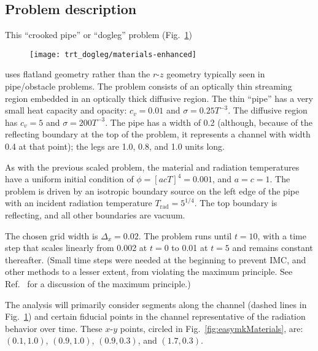 \subsection{Problem description}

This ``crooked pipe'' or ``dogleg'' problem (Fig.~\ref{fig:doglegMaterials})
%
\begin{figure}[htb]
  \centering
  \texttt{[image: trt\_dogleg/materials-enhanced]}
  \label{fig:doglegMaterials}
\end{figure}
%
uses flatland geometry rather than the $r$-$z$ geometry typically seen in
pipe/obstacle problems. The problem consists of an optically thin
streaming region embedded in an optically thick diffusive region. The thin
``pipe'' has a very small heat capacity and opacity: $c_v=0.01$ and
$\sigma=0.25T^{-3}$. The diffusive region has $c_v=5$ and $\sigma=200 T^{-3}$.
The pipe has a width of 0.2 (although, because of the reflecting boundary at
the top of the problem, it represents a channel with width 0.4 at that point);
the legs are 1.0, 0.8, and 1.0 units long.

As with the previous scaled problem, the material and radiation temperatures
have a uniform initial condition of $\phi = [ac T]^4 = 0.001$, and $a=c=1$. The
problem is driven by an isotropic boundary source on the left edge of the pipe
with an incident radiation temperature $T_\text{rad} = 5^{1/4}$. The top
boundary is reflecting, and all other boundaries are vacuum.

The chosen grid width is $\Delta_x = 0.02$. The problem runs until $t=10$, with
a time step that scales linearly from 0.002 at $t=0$ to 0.01 at $t=5$ and
remains constant thereafter. (Small time steps were needed at the beginning to
prevent IMC, and other methods to a lesser extent, from violating the maximum
principle. See Ref.~\cite{Lar1987} for a discussion of the maximum principle.)

The analysis will primarily consider segments along the channel (dashed lines
in Fig.~\ref{fig:doglegMaterials}) and certain fiducial points in the channel
representative of the radiation behavior over time. These $x$-$y$ points,
circled in Fig.~\ref{fig:easymkMaterials}, are: $(0.1, 1.0)$, $(0.9, 1.0)$,
$(0.9, 0.3)$, and $(1.7, 0.3)$.

